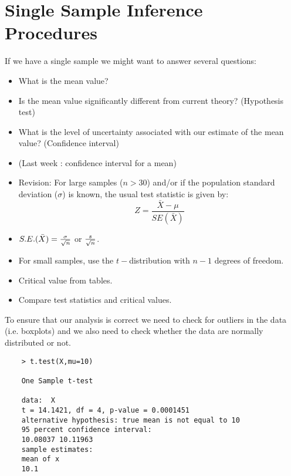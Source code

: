 \section{Single Sample Inference Procedures}
If we have a single sample we might want to answer several
questions:
\begin{itemize}
	\item What is the mean value? \item Is the mean value
	significantly different from current theory? (Hypothesis test)
	\item What is the level of uncertainty associated with our
	estimate of the mean value? (Confidence interval)
\end{itemize}

\begin{itemize}
	\item (Last week : confidence interval for a mean) \item Revision:
	For large samples ($n > 30$) and/or if the population standard
	deviation ($\sigma$) is known, the usual test statistic is given
	by: \[Z =\frac{\bar{X} - \mu}{SE(\bar{X})}\]
	
	\item $S.E.(\bar{X}) = { \sigma \over \sqrt{n}} $ or ${s \over \sqrt{n}}$. 
	\item For small samples, use the $t-$distribution with $n-1$ degrees of freedom.
	\item Critical value from tables.
	\item Compare test statistics and critical values.
\end{itemize}

To ensure that our analysis is correct we need to check for
outliers in the data (i.e. boxplots) and we also need to check
whether the data are normally distributed or not.

\begin{framed}
	\begin{verbatim}
	> t.test(X,mu=10)
	
	One Sample t-test
	
	data:  X 
	t = 14.1421, df = 4, p-value = 0.0001451
	alternative hypothesis: true mean is not equal to 10 
	95 percent confidence interval:
	10.08037 10.11963 
	sample estimates:
	mean of x 
	10.1 
	\end{verbatim}
\end{framed}




